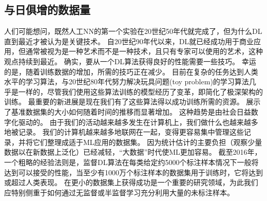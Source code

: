 \subsection{与日俱增的数据量}
\label{sec:increasing_dataset_sizes}
人们可能想问，既然人工\gls{NN}的第一个实验在20世纪50年代就完成了，但为什么\gls{DL}直到最近才被认为是关键技术。
自20世纪90年代以来，\gls{DL}就已经成功用于商业应用，但通常被视为是一种艺术而不是一种技术，且只有专家可以使用的艺术，这种观点持续到最近。
确实，要从一个\gls{DL}算法获得良好的性能需要一些技巧。
幸运的是，随着训练数据的增加，所需的技巧正在减少。
目前在复杂的任务达到人类水平的学习算法，与20世纪80年代努力解决玩具问题(toy problem)的学习算法几乎是一样的，尽管我们使用这些算法训练的模型经历了变革，即简化了极深架构的训练。
最重要的新进展是现在我们有了这些算法得以成功训练所需的资源。
展示了基准数据集的大小如何随着时间的推移而显著增加。
这种趋势是由社会日益数字化驱动的。
由于我们的活动越来越多发生在计算机上，我们做什么也越来越多地被记录。
我们的计算机越来越多地联网在一起，变得更容易集中管理这些记录，并将它们整理成适于\gls{ML}应用的数据集。
因为统计估计的主要负担（观察少量数据以在新数据上泛化）已经减轻，``大数据''时代使\gls{ML}更加容易。
截至2016年，一个粗略的经验法则是，监督\gls{DL}算法在每类给定约5000个标注样本情况下一般将达到可以接受的性能，当至少有1000万个标注样本的数据集用于训练时，它将达到或超过人类表现。
在更小的数据集上获得成功是一个重要的研究领域，为此我们应特别侧重于如何通过无监督或半监督学习充分利用大量的未标注样本。

